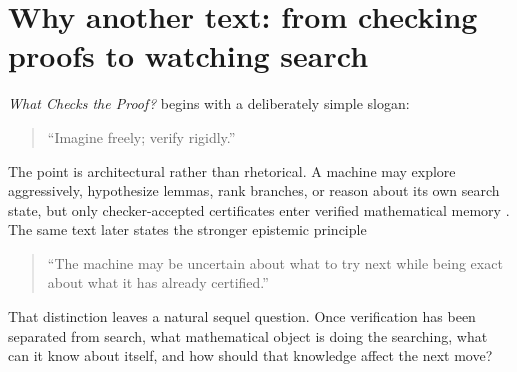 \documentclass[11pt]{article}
\theoremstyle{definition}
\theoremstyle{remark}
\begin{document}
\begin{abstract}
The Universal Proof-Horizon Operator is then connected explicitly to the SIC and nonstandard-horizon formulations. For an arithmetically represented effective proof presentation, ordinary finite Proof-Horizon halting, standard derivability, and existence of a proof below an unlimited nonstandard cost bound are equivalent on standard targets; the unlimited bound dominates every standard theorem-specific proof horizon without becoming an executable standard runtime. Formal self-description is then given an operational role. A tagged settlement machine can, under effective representability and fair proof search, prove a formal statement of its own ATP status; checked current-state descriptions can be used by the controller without altering verifier semantics. The final sections convert these results into a staged experimental program whose primary endpoint is not prediction accuracy but independently verified settlement of withheld and eventually genuinely difficult conjectures.
\end{abstract}

\begin{center}
\end{center}

\tableofcontents
\newpage

\section{Why another text: from checking proofs to watching search}

\emph{What Checks the Proof?} begins with a deliberately simple slogan:
\begin{quote}
``Imagine freely; verify rigidly.''
\end{quote}
The point is architectural rather than rhetorical. A machine may explore aggressively, hypothesize lemmas, rank branches, or reason about its own search state, but only checker-accepted certificates enter verified mathematical memory \cite{WCTP}. The same text later states the stronger epistemic principle
\begin{quote}
``The machine may be uncertain about what to try next while being exact about what it has already certified.''
\end{quote}
That distinction leaves a natural sequel question. Once verification has been separated from search, what mathematical object is doing the searching, what can it know about itself, and how should that knowledge affect the next move?
\end{document}
